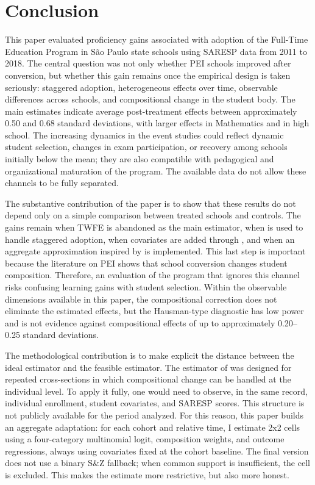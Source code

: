 \section{Conclusion} \label{sec:conclusion}

This paper evaluated proficiency gains associated with adoption of the Full-Time Education Program in São Paulo state schools using SARESP data from 2011 to 2018. The central question was not only whether PEI schools improved after conversion, but whether this gain remains once the empirical design is taken seriously: staggered adoption, heterogeneous effects over time, observable differences across schools, and compositional change in the student body. The main estimates indicate average post-treatment effects between approximately 0.50 and 0.68 standard deviations, with larger effects in Mathematics and in high school. The increasing dynamics in the event studies could reflect dynamic student selection, changes in exam participation, or recovery among schools initially below the mean; they are also compatible with pedagogical and organizational maturation of the program. The available data do not allow these channels to be fully separated.

The substantive contribution of the paper is to show that these results do not depend only on a simple comparison between treated schools and controls. The gains remain when TWFE is abandoned as the main estimator, when \textcite{callawaysantanna} is used to handle staggered adoption, when covariates are added through \textcite{santannazhao}, and when an aggregate approximation inspired by \textcite{santannaxu} is implemented. This last step is important because the literature on PEI shows that school conversion changes student composition. Therefore, an evaluation of the program that ignores this channel risks confusing learning gains with student selection. Within the observable dimensions available in this paper, the compositional correction does not eliminate the estimated effects, but the Hausman-type diagnostic has low power and is not evidence against compositional effects of up to approximately 0.20--0.25 standard deviations.

The methodological contribution is to make explicit the distance between the ideal estimator and the feasible estimator. The estimator of \textcite{santannaxu} was designed for repeated cross-sections in which compositional change can be handled at the individual level. To apply it fully, one would need to observe, in the same record, individual enrollment, student covariates, and SARESP scores. This structure is not publicly available for the period analyzed. For this reason, this paper builds an aggregate adaptation: for each cohort and relative time, I estimate 2x2 cells using a four-category multinomial logit, composition weights, and outcome regressions, always using covariates fixed at the cohort baseline. The final version does not use a binary S\&Z fallback; when common support is insufficient, the cell is excluded. This makes the estimate more restrictive, but also more honest.


